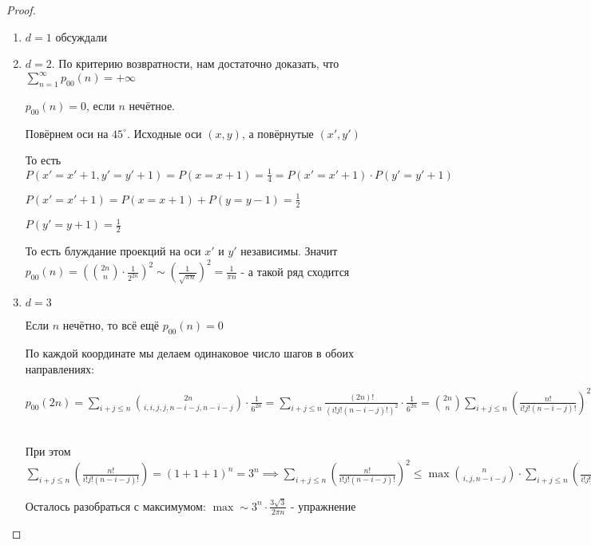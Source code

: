 \begin{proof}
    \begin{enumerate}
        \item $d = 1$ обсуждали
        \item {
            $d = 2$. По критерию возвратности, нам достаточно доказать, что $\sum\limits_{n=1}^\infty p_{00} (n) = +\infty$

            $p_{00} (n) = 0$, если $n$ нечётное. 
            
            Повёрнем оси на $45^{\circ}$. Исходные оси $(x, y)$, а повёрнутые $(x', y')$

            То есть $P(x' = x' + 1, y' = y' + 1) = P(x = x + 1) = \frac{1}{4} = P(x' = x' + 1) \cdot P(y' = y' + 1)$

            $P(x' = x' + 1) = P(x = x + 1) + P(y = y - 1) = \frac{1}{2}$

            $P(y' = y + 1) = \frac{1}{2}$

            То есть блуждание проекций на оси $x'$ и $y'$ независимы. Значит $p_{00}(n) =
            \left( \binom{2n}{n} \cdot \frac{1}{2^{2n}} \right)^2 \sim \left( \frac{1}{\sqrt{\pi n}} \right)^2 = \frac{1}{\pi n}$ - а такой ряд сходится
        }
        \item {
            $d = 3$

            Если $n$ нечётно, то всё ещё $p_{00} (n) = 0$

            По каждой координате мы делаем одинаковое число шагов в обоих направлениях: 
            
            $p_{00} (2n) = \sum\limits_{i + j \leqslant n} \binom{2n}{i, i, j, j, n - i -j, n - i - j} \cdot \frac{1}{6^{2n}} = \sum\limits_{i + j \leqslant n} \frac{(2n)!}{(i!j!(n-i-j)!)^2} \cdot \frac{1}{6^{2n}} = 
            \binom{2n}{n} \sum\limits_{i + j \leqslant n} \left( \frac{n!}{i!j!(n - i - j)!} \right)^2 \cdot \frac{1}{6^{2n}} = \overset{*}{\leqslant} \underbrace{\frac{\binom{2n}{n}}{6^{2n}} \cdot 3^n}_{\sim \frac{1}{\sqrt{\pi n} \cdot \frac{1}{3^n}}} \cdot \max \binom{n}{i, j, n - i - j} $

            При этом $\sum\limits_{i + j \leqslant n} \left( \frac{n!}{i!j!(n - i - j)!} \right) = (1 + 1 + 1)^n = 3^n \implies \sum\limits_{i + j \leqslant n} \left( \frac{n!}{i!j!(n - i - j)!} \right)^2 \leqslant \max \binom{n}{i, j, n - i - j} \cdot \sum\limits_{i + j \leqslant n} \left( \frac{n!}{i!j!(n - i - j)!} \right) \sim (*)$

            Осталось разобраться с максимумом: $\max \sim 3^n \cdot \frac{3\sqrt{3}}{2 \pi n}$ - упражнение

}
\end{enumerate}
\end{proof}
